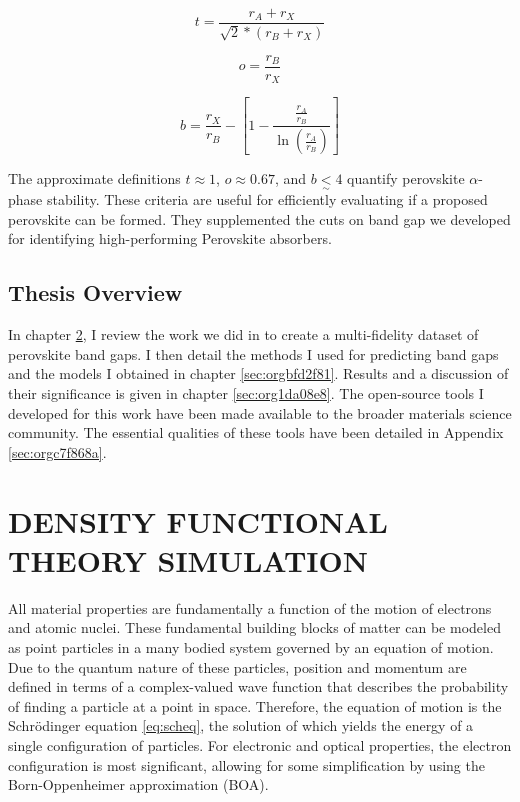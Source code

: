 \begin{equation}
\label{eq:t}
t = \frac{r_A+r_X}{\sqrt{2}*(r_B+r_X)}
\end{equation}

\begin{equation}
\label{eq:o}
o=\frac{r_B}{r_X}
\end{equation}

\begin{equation}
\label{eq:b}
b = \frac{r_X}{r_B}-\left[ 1-\frac{\frac{r_A}{r_B}}{\ln(\frac{r_A}{r_B})} \right]
\end{equation}

The approximate definitions \(t \approx 1\), \(o \approx 0.67\), and \(b \underset{\sim}{<} 4\) quantify perovskite \(\alpha\)-phase stability.
\autocite{yin-2015-halid-perov,bartel-2019-new-toler}
These criteria are useful for efficiently evaluating if a proposed perovskite can be formed.
They supplemented the cuts on band gap we developed for identifying high-performing Perovskite absorbers.

\section{Thesis Overview}
\label{sec:org3722640}
In chapter \ref{sec:org44ac04c}, I review the work we did in \autocite{yang-2023-high-throug} to create a multi-fidelity dataset of perovskite band gaps.
I then detail the methods I used for predicting band gaps and the models I obtained in chapter \ref{sec:orgbfd2f81}.
Results and a discussion of their significance is given in chapter \ref{sec:org1da08e8}.
The open-source tools I developed for this work have been made available to the broader materials science community.
The essential qualities of these tools have been detailed in Appendix \ref{sec:orgc7f868a}.

\chapter{DENSITY FUNCTIONAL THEORY SIMULATION}
\label{sec:org44ac04c}
All material properties are fundamentally a function of the motion of electrons and atomic nuclei.
These fundamental building blocks of matter can be modeled as point particles in a many bodied system governed by an equation of motion.
Due to the quantum nature of these particles, position and momentum are defined in terms of a complex-valued wave function that describes the probability of finding a particle at a point in space.
Therefore, the equation of motion is the Schrödinger equation \eqref{eq:scheq}, the solution of which yields the energy of a single configuration of particles.
For electronic and optical properties, the electron configuration is most significant, allowing for some simplification by using the Born-Oppenheimer approximation (BOA).

